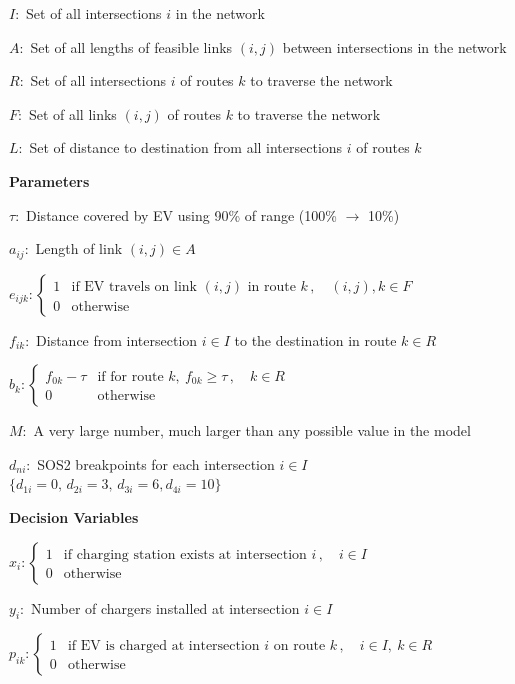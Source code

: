 \documentclass[12pt, fleqn]{article}
\begin{document}
$I:$ Set of all intersections $i$ in the network

$A:$ Set of all lengths of feasible links $(i,j)$ between intersections in the network

$R:$ Set of all intersections $i$ of routes $k$ to traverse the network

$F:$ Set of all links $(i,j)$ of routes $k$ to traverse the network

$L:$ Set of distance to destination from all intersections $i$ of routes $k$

\medskip
\textbf{Parameters}
\smallskip

$\tau:$ Distance covered by EV using 90\% of range (100\% $\rightarrow$ 10\%)

$a_{ij}:$ Length of link $(i,j) \in A$

$e_{ijk}: \begin{cases}
        1 & \text{if EV travels on link } (i,j) \text{ in route } k \,, \quad (i,j), k \in F \\
        0 & \text{otherwise}
    \end{cases}$

$f_{ik}:$ Distance from intersection $i \in I$ to the destination in route $k \in R$

$b_{k}: \begin{cases}
        f_{0k}-\tau & \text{if for route } k,\ f_{0k} \geq \tau \,, \quad k \in R \\
        0           & \text{otherwise}
    \end{cases}$

$M:$ A very large number, much larger than any possible value in the model

$d_{ni}:$ SOS2 breakpoints for each intersection $i \in I$ $\{d_{1i}=0,\, d_{2i}=3,\, d_{3i}=6, d_{4i}=10\}$

\medskip
\textbf{Decision Variables}
\smallskip

$x_{i}: \begin{cases}
        1 & \text{if charging station exists at intersection } i \,, \quad i \in I \\
        0 & \text{otherwise}
    \end{cases}$

$y_{i}:$ Number of chargers installed at intersection $i \in I$

$p_{ik}: \begin{cases}
        1 & \text{if EV is charged at intersection } i \text{ on route } k \,, \quad i \in I,\ k \in R \\
        0 & \text{otherwise}
    \end{cases}$
\end{document}
